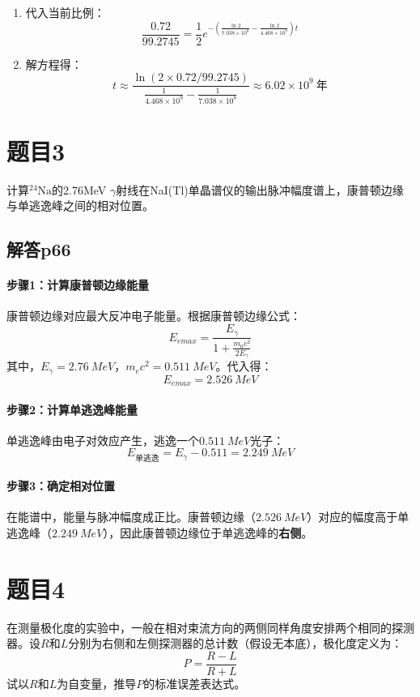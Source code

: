 \documentclass{article}
\begin{document}
\begin{enumerate}
\begin{enumerate}
        \item 代入当前比例：
        $$
        \frac{0.72}{99.2745} = \frac{1}{2} e^{-(\frac{\ln2}{7.038\times10^8} - \frac{\ln2}{4.468\times10^9})t}
        $$
        
        \item 解方程得：
        $$
        t \approx \frac{\ln(2 \times 0.72/99.2745)}{\frac{1}{4.468\times10^9} - \frac{1}{7.038\times10^8}} \approx 6.02\times10^9\ \mathrm{年}
        $$
    \end{enumerate}
\end{enumerate}

\section*{题目3}
计算$\mathrm{^{24}Na}$的2.76MeV $\gamma$射线在NaI(Tl)单晶谱仪的输出脉冲幅度谱上，康普顿边缘与单逃逸峰之间的相对位置。

\subsection*{解答p66}

\paragraph{步骤1：计算康普顿边缘能量}
康普顿边缘对应最大反冲电子能量。根据康普顿边缘公式：
$$
E_{emax} =   \frac{E_\gamma}{1 + \frac{m_0 c^2}{2E_\gamma}} 
$$
其中，$E_\gamma = \SI{2.76}{MeV}$，$m_e c^2 = \SI{0.511}{MeV}$。代入得：
$$
E_{emax} = \SI{2.526}{MeV}
$$

\paragraph{步骤2：计算单逃逸峰能量}
单逃逸峰由电子对效应产生，逃逸一个$\SI{0.511}{MeV}$光子：
$$
E_{\text{单逃逸}} = E_\gamma - 0.511 = \SI{2.249}{MeV}
$$

\paragraph{步骤3：确定相对位置}
在能谱中，能量与脉冲幅度成正比。康普顿边缘（$\SI{2.526}{MeV}$）对应的幅度高于单逃逸峰（$\SI{2.249}{MeV}$），因此康普顿边缘位于单逃逸峰的\textbf{右侧}。

\section*{题目4}
在测量极化度的实验中，一般在相对束流方向的两侧同样角度安排两个相同的探测器。设$R$和$L$分别为右侧和左侧探测器的总计数（假设无本底），极化度定义为：
$$
P = \frac{R - L}{R + L}
$$
试以$R$和$L$为自变量，推导$P$的标准误差表达式。
\end{document}
